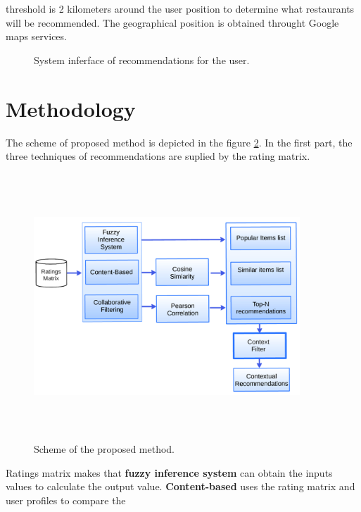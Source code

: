 threshold is 2 kilometers around the user position to determine what
restaurants will be recommended. The geographical position is
obtained throught Google maps services.
\begin{figure}
\captionsetup{font=footnotesize}
\centering
{}
\caption{System inferface of recommendations for the user.}
\label{fig:recom}    
\end{figure}

\section{Methodology} 

The scheme of proposed method is depicted in the figure
\ref{fig:archit}. In the first part, the three techniques of
recommendations are suplied by the rating matrix. 
\begin{figure}
\captionsetup{font=footnotesize}
\centering 
\includegraphics[width=10cm,height=10cm,keepaspectratio]{img/archit.png}
\caption{Scheme of the proposed method.}
\label{fig:archit}  
\end{figure}
Ratings matrix makes that \textbf{fuzzy inference system} can obtain
the inputs values to calculate the output value. \textbf{Content-based} 
uses the rating matrix and user profiles to compare the

